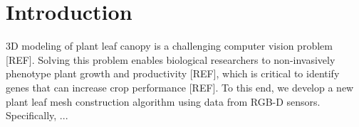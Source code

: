 \section{Introduction}
\label{sec:intro}


3D modeling of plant leaf canopy is a challenging computer vision problem [REF]. Solving this problem enables biological researchers to non-invasively phenotype plant growth and productivity [REF], which is critical to identify genes that can increase crop performance [REF].
%
To this end, we develop a new plant leaf mesh construction algorithm using data from RGB-D sensors. Specifically, ... 